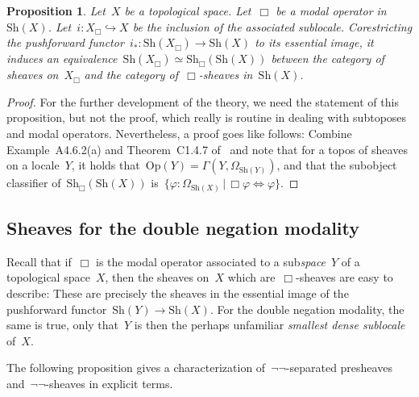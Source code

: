 \documentclass[10pt]{amsart}
\theoremstyle{definition}
\theoremstyle{plain}
\newtheorem{prop}[defn]{Proposition}
\theoremstyle{remark}
\newcommand{\Sh}{\mathrm{Sh}}
\newcommand{\Open}{\mathrm{Op}}
\newcommand{\?}{\,{:}\,}
\renewcommand{\_}{\mathpunct{.}\,}
\begin{document}
\begin{prop}Let~$X$ be a topological space. Let~$\Box$ be a modal operator
in~$\Sh(X)$. Let~$i : X_\Box \hookrightarrow X$ be the inclusion of the
associated sublocale. Corestricting the pushforward functor~$i_* : \Sh(X_\Box) \to
\Sh(X)$ to its essential image, it induces an equivalence~$\Sh(X_\Box) \simeq
\Sh_\Box(\Sh(X))$ between the category of sheaves on~$X_\Box$ and the category
of~$\Box$-sheaves in~$\Sh(X)$.
\end{prop}
\begin{proof}For the further development of the theory, we need the statement
of this proposition, but not the proof, which really is routine in dealing with
subtoposes and modal operators. Nevertheless, a proof goes like follows:
Combine Example~A4.6.2(a) and Theorem~C1.4.7
of~\cite{johnstone:elephant} and note that for a topos of sheaves on a
locale~$Y$, it holds that~$\Open(Y) = \Gamma(Y, \Omega_{\Sh(Y)})$, and that the
subobject classifier of~$\Sh_\Box(\Sh(X))$ is~$\{ \varphi : \Omega_{\Sh(X)} \,|\,
\Box \varphi \Leftrightarrow \varphi \}$.
\end{proof}


\subsection{Sheaves for the double negation modality}
\label{sect:negneg-sheaves}

Recall that if~$\Box$ is the modal operator associated to a sub\emph{space}~$Y$
of a topological space~$X$, then the sheaves on~$X$ which are~$\Box$-sheaves
are easy to describe: These are precisely the sheaves in the essential image of
the pushforward functor~$\Sh(Y) \to \Sh(X)$. For the double negation modality,
the same is true, only that~$Y$ is then the perhaps unfamiliar \emph{smallest
dense sublocale} of~$X$.

The following proposition gives a characterization of~$\neg\neg$-separated
presheaves and~$\neg\neg$-sheaves in explicit terms.
\end{document}
